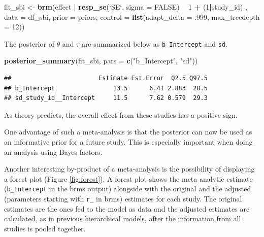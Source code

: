 \documentclass[12pt,]{krantz}
\newenvironment{Shaded}{\begin{snugshade}}{\end{snugshade}}
\newcommand{\DataTypeTok}[1]{\textcolor[rgb]{0.13,0.29,0.53}{#1}}
\newcommand{\DecValTok}[1]{\textcolor[rgb]{0.00,0.00,0.81}{#1}}
\newcommand{\FloatTok}[1]{\textcolor[rgb]{0.00,0.00,0.81}{#1}}
\newcommand{\KeywordTok}[1]{\textcolor[rgb]{0.13,0.29,0.53}{\textbf{#1}}}
\newcommand{\NormalTok}[1]{#1}
\newcommand{\OperatorTok}[1]{\textcolor[rgb]{0.81,0.36,0.00}{\textbf{#1}}}
\newcommand{\OtherTok}[1]{\textcolor[rgb]{0.56,0.35,0.01}{#1}}
\newcommand{\StringTok}[1]{\textcolor[rgb]{0.31,0.60,0.02}{#1}}
\theoremstyle{definition}
\theoremstyle{definition}
\theoremstyle{definition}
\theoremstyle{remark}
\begin{document}
\begin{Shaded}
\begin{Highlighting}[]
\NormalTok{fit_sbi <-}\StringTok{ }\KeywordTok{brm}\NormalTok{(effect }\OperatorTok{|}\StringTok{ }\KeywordTok{resp_se}\NormalTok{(}\StringTok{`}\DataTypeTok{SE}\StringTok{`}\NormalTok{, }\DataTypeTok{sigma =} \OtherTok{FALSE}\NormalTok{) }\OperatorTok{~}\StringTok{ }\DecValTok{1} \OperatorTok{+}\StringTok{ }\NormalTok{(}\DecValTok{1}\OperatorTok{|}\NormalTok{study_id) , }
               \DataTypeTok{data =}\NormalTok{ df_sbi,}
               \DataTypeTok{prior =}\NormalTok{ priors,}
               \DataTypeTok{control =} \KeywordTok{list}\NormalTok{(}\DataTypeTok{adapt_delta =} \FloatTok{.999}\NormalTok{, }
                              \DataTypeTok{max_treedepth =} \DecValTok{12}\NormalTok{))}
\end{Highlighting}
\end{Shaded}

The posterior of \(\theta\) and \(\tau\) are summarized below as \texttt{b\_Intercept} and \texttt{sd}.

\begin{Shaded}
\begin{Highlighting}[]
\KeywordTok{posterior_summary}\NormalTok{(fit_sbi, }\DataTypeTok{pars =} \KeywordTok{c}\NormalTok{(}\StringTok{"b_Intercept"}\NormalTok{, }\StringTok{"sd"}\NormalTok{))}
\end{Highlighting}
\end{Shaded}

\begin{verbatim}
##                        Estimate Est.Error  Q2.5 Q97.5
## b_Intercept                13.5      6.41 2.883  28.5
## sd_study_id__Intercept     11.5      7.62 0.579  29.3
\end{verbatim}

As theory predicts, the overall effect from these studies has a positive sign.

One advantage of such a meta-analysis is that the posterior can now be used as an informative prior for a future study. This is especially important when doing an analysis using Bayes factors.

Another interesting by-product of a meta-analysis is the possibility of displaying a forest plot (Figure \ref{fig:forest}). A forest plot shows the meta analytic estimate (\texttt{b\_Intercept} in the brms output) alongside with the original and the adjusted (parameters starting with \texttt{r\_} in brms) estimates for each study. The original estimates are the ones fed to the model as data and the adjusted estimates are calculated, as in previous hierarchical models, after the information from all studies is pooled together.
\end{document}

